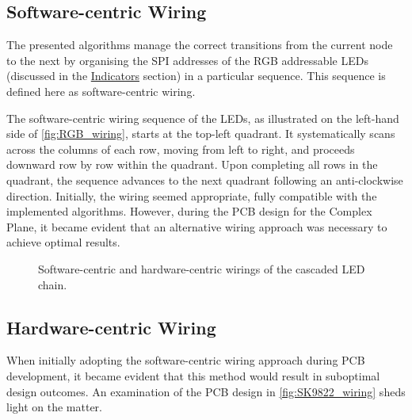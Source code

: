 \documentclass[12pt]{article}
\numberwithin{subsubsubsection}{subsubsection}
\begin{document}
\newpage

\subsection{Software-centric Wiring}

The presented algorithms manage the correct transitions from the current node to the next by organising the SPI addresses of the RGB addressable LEDs (discussed in the \hyperref[indicators]{Indicators} section) in a particular sequence. This sequence is defined here as software-centric wiring. 

The software-centric wiring sequence of the LEDs, as illustrated on the left-hand side of \autoref{fig:RGB_wiring}, starts at the top-left quadrant. It systematically scans across the columns of each row, moving from left to right, and proceeds downward row by row within the quadrant. Upon completing all rows in the quadrant, the sequence advances to the next quadrant following an anti-clockwise direction. Initially, the wiring seemed appropriate, fully compatible with the implemented algorithms. However, during the PCB design for the Complex Plane, it became evident that an alternative wiring approach was necessary to achieve optimal results.


\begin{figure}[H]
    \centering
    \caption{Software-centric and hardware-centric wirings of the cascaded LED chain.}
    \label{fig:RGB_wiring}
\end{figure}

\subsection{Hardware-centric Wiring}
When initially adopting the software-centric wiring approach during PCB development, it became evident that this method would result in suboptimal design outcomes. An examination of the PCB design in \autoref{fig:SK9822_wiring} sheds light on the matter.
\end{document}

